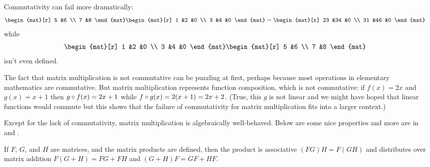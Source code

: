 \begin{example}  \label{ex:MatMultNoCommuteII}
Commutativity can fail more dramatically:
\begin{equation*}
    \begin{mat}[r]
      5  &6  \\
      7  &8
    \end{mat}
    \begin{mat}[r]
      1  &2  &0 \\
      3  &4  &0
    \end{mat}
  =
    \begin{mat}[r]
      23  &34  &0  \\
      31  &46  &0
    \end{mat}
\end{equation*}
while
\begin{equation*}
    \begin{mat}[r]
      1  &2  &0 \\
      3  &4  &0
    \end{mat}
    \begin{mat}[r]
      5  &6  \\
      7  &8
    \end{mat}
\end{equation*}
isn't even defined.
\end{example}

\begin{remark}
The fact that
matrix multiplication is not commutative can be puzzling at first, 
perhaps because most
operations in elementary mathematics are commutative.
But matrix multiplication represents function composition, which
is not commutative: if
\( f(x)=2x \) and \( g(x)=x+1 \) then \( g\mathbin\circ f(x)=2x+1 \)
while \( f\mathbin\circ g(x)=2(x+1)=2x+2 \).
(True, this \( g \) is not linear and we might have hoped that linear functions
would commute but this shows that the failure of commutativity for
matrix multiplication fits into a larger context.)
\end{remark}

Except for the lack of commutativity,
matrix multiplication is algebraically well-behaved.
Below are some nice properties and more are in
 and
.

\begin{theorem}
\label{th:MatMultWellBehaved}
If \( F \), \( G \), and \( H \) are matrices,
and the matrix products are defined,
then the product is associative
$(FG)H=F(GH)$
and distributes over matrix addition
$F(G+H)=FG+FH$ and $(G+H)F=GF+HF$.
\end{theorem}


